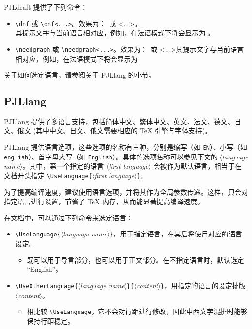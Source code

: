 \documentclass[Chinese,English,French,allowbf,puretext]{lebhart}
\providecommand{\meta}[1]{$\langle${\normalfont\itshape#1}$\rangle$}
\newenvironment{tip}[1][提示]{%
    \begin{tcolorbox}[breakable,
        enhanced,
        width = \textwidth,
        colback = paper, colbacktitle = paper,
        colframe = gray!50, boxrule=0.2mm,
        coltitle = black,
        fonttitle = \sffamily,
        attach boxed title to top left = {yshift=-\tcboxedtitleheight/2, xshift=.5cm},
        boxed title style = {boxrule=0pt, colframe=paper},
        before skip = 0.3cm,
        after skip = 0.3cm,
        top = 3mm,
        bottom = 3mm,
        title={\scshape\sffamily #1}]%
}{\end{tcolorbox}}
\providecommand{\PJLdraft}{\textsf{PJLdraft}}
\providecommand{\PJLlang}{\textsf{PJLlang}}
\begin{document}
\PJLdraft{} 提供了下列命令：
\begin{itemize}
    \item \lstinline|\dnf| 或 \lstinline|\dnf<...>|。效果为：\dnf~或 \dnf<...>。\\其提示文字与当前语言相对应，例如，在法语模式下将会显示为 。
    \item \lstinline|\needgraph| 或 \lstinline|\needgraph<...>|。效果为：\needgraph~或 \needgraph<...>其提示文字与当前语言相对应，例如，在法语模式下将会显示为 
\end{itemize}

关于如何选定语言，请参阅关于 \PJLlang{} 的小节。

\subsection{PJLlang}

\PJLlang{} 提供了多语言支持，包括简体中文、繁体中文、英文、法文、德文、日文、俄文 (其中中文、日文、俄文需要相应的 \TeX{} 引擎与字体支持)。

\medskip
\PJLlang{} 提供语言选项，这些选项的名称有三种，分别是缩写（如 \texttt{EN}）、小写（如 \texttt{english}）、首字母大写（如 \texttt{English}）。具体的选项名称可以参见下文的 \meta{language name}。其中，第一个指定的语言 \meta{first language} 会被作为默认语言，相当于在文档开头指定 \lstinline|\UseLanguage{|\meta{first language}\lstinline|}|。

\begin{tip}
    为了提高编译速度，建议使用语言选项，并将其作为全局参数传递。这样，只会对指定语言进行设置，节省了 \TeX{} 内存，从而能显著提高编译速度。
\end{tip}

\medskip
在文档中，可以通过下列命令来选定语言：
\begin{itemize}
    \item \lstinline|\UseLanguage{|\meta{language name}\lstinline|}|，用于指定语言，在其后将使用对应的语言设定。
    \begin{itemize}
        \item 既可以用于导言部分，也可以用于正文部分。在不指定语言时，默认选定 “English”。
    \end{itemize}
    \item \lstinline|\UseOtherLanguage{|\meta{language name}\lstinline|}{|\meta{content}\lstinline|}|，用指定的语言的设定排版 \meta{content}。
    \begin{itemize}
        \item 相比较 \lstinline|\UseLanguage|，它不会对行距进行修改，因此中西文字混排时能够保持行距稳定。
    \end{itemize}
\end{itemize}
\end{document}
